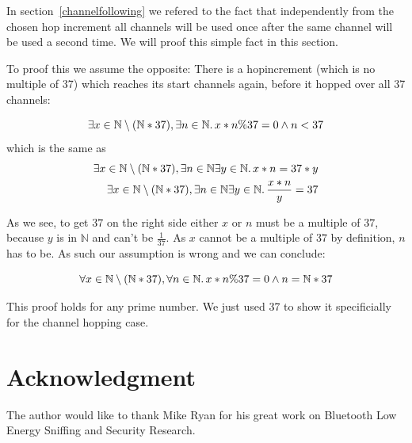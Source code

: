 \documentclass[conference]{IEEEtran}
\begin{document}
In section~\ref{channelfollowing} we refered to the fact that independently 
from the chosen hop increment all channels will be used once after the same 
channel will be used a second time. We will proof this simple fact in this 
section.

To proof this we assume the opposite: There is a hopincrement (which is no multiple of 37) which reaches its start channels again, before it hopped over all 37 channels:

\begin{equation*}
  \exists x\in\mathbb{N}\setminus (\mathbb{N} * 37), \exists n\in\mathbb{N}\ldotp x*n \% 37 = 0 \wedge n < 37
\end{equation*}
which is the same as
\begin{equation*}
  \begin{split}
    \exists x\in\mathbb{N}\setminus (\mathbb{N} * 37), \exists n\in\mathbb{N}\exists y\in\mathbb{N}\ldotp x*n = 37 * y \\
    \exists x\in\mathbb{N}\setminus (\mathbb{N} * 37), \exists n\in\mathbb{N}\exists y\in\mathbb{N}\ldotp \frac{x*n}{y} = 37
  \end{split}
\end{equation*}

As we see, to get $37$ on the right side either $x$ or $n$ must be a multiple of $37$, because $y$ is in $\mathbb{N}$ and can't be $\frac{1}{37}$. As $x$ cannot be a multiple of $37$ by definition, $n$ has to be. As such our assumption is wrong and we can conclude:

\begin{equation*}
  \forall x\in\mathbb{N}\setminus (\mathbb{N} * 37), \forall n\in\mathbb{N}\ldotp x*n \% 37 = 0 \wedge n = \mathbb{N} * 37
\end{equation*}

This proof holds for any prime number. We just used 37 to show it specificially for the channel hopping case.

\section*{Acknowledgment}

The author would like to thank Mike Ryan for his great work on Bluetooth Low Energy Sniffing and Security Research.

\ifCLASSOPTIONcaptionsoff
  \newpage
\fi
\end{document}
